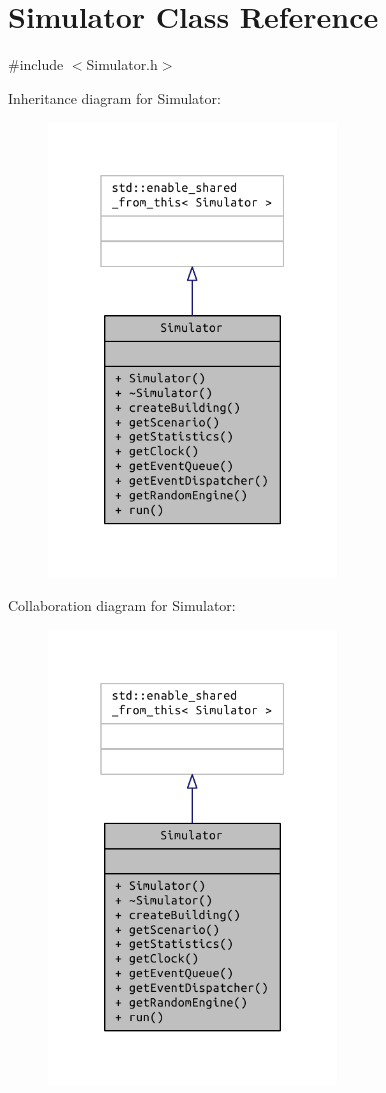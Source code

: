 \hypertarget{class_simulator}{}\section{Simulator Class Reference}
\label{class_simulator}


{\ttfamily \#include $<$Simulator.\+h$>$}



Inheritance diagram for Simulator\+:
\nopagebreak
\begin{figure}[H]
\begin{center}
\leavevmode
\includegraphics[width=217pt]{class_simulator__inherit__graph}
\end{center}
\end{figure}


Collaboration diagram for Simulator\+:
\nopagebreak
\begin{figure}[H]
\begin{center}
\leavevmode
\includegraphics[width=217pt]{class_simulator__coll__graph}
\end{center}
\end{figure}

